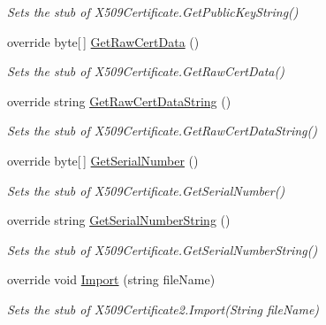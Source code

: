 \begin{DoxyCompactItemize}
\begin{DoxyCompactList}\small\item\em Sets the stub of X509\-Certificate.\-Get\-Public\-Key\-String()\end{DoxyCompactList}\item 
override byte\mbox{[}$\,$\mbox{]} \hyperlink{class_system_1_1_security_1_1_cryptography_1_1_x509_certificates_1_1_fakes_1_1_stub_x509_certificate2_aa5884eae275c22da2a2f95cf531e4f46}{Get\-Raw\-Cert\-Data} ()
\begin{DoxyCompactList}\small\item\em Sets the stub of X509\-Certificate.\-Get\-Raw\-Cert\-Data()\end{DoxyCompactList}\item 
override string \hyperlink{class_system_1_1_security_1_1_cryptography_1_1_x509_certificates_1_1_fakes_1_1_stub_x509_certificate2_ac4bd0c45fce9fbaf4903820bd8151833}{Get\-Raw\-Cert\-Data\-String} ()
\begin{DoxyCompactList}\small\item\em Sets the stub of X509\-Certificate.\-Get\-Raw\-Cert\-Data\-String()\end{DoxyCompactList}\item 
override byte\mbox{[}$\,$\mbox{]} \hyperlink{class_system_1_1_security_1_1_cryptography_1_1_x509_certificates_1_1_fakes_1_1_stub_x509_certificate2_adfbfb0e1ddfb1c7c70f328a4895870ea}{Get\-Serial\-Number} ()
\begin{DoxyCompactList}\small\item\em Sets the stub of X509\-Certificate.\-Get\-Serial\-Number()\end{DoxyCompactList}\item 
override string \hyperlink{class_system_1_1_security_1_1_cryptography_1_1_x509_certificates_1_1_fakes_1_1_stub_x509_certificate2_a4d86d6512a80a5e0592d0fa454c0731f}{Get\-Serial\-Number\-String} ()
\begin{DoxyCompactList}\small\item\em Sets the stub of X509\-Certificate.\-Get\-Serial\-Number\-String()\end{DoxyCompactList}\item 
override void \hyperlink{class_system_1_1_security_1_1_cryptography_1_1_x509_certificates_1_1_fakes_1_1_stub_x509_certificate2_ae55e9bb28787a4c8140a652bbab43b0b}{Import} (string file\-Name)
\begin{DoxyCompactList}\small\item\em Sets the stub of X509\-Certificate2.\-Import(\-String file\-Name)\end{DoxyCompactList}\item 

\end{DoxyCompactItemize}
